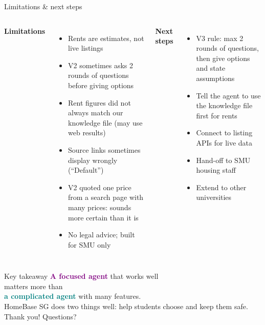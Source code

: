 \documentclass[aspectratio=169,11pt]{beamer}
\begin{document}
\begin{frame}{Limitations \& next steps}
\begin{columns}[T]
\textbf{Limitations}
\begin{itemize}\footnotesize
  \item Rents are estimates, not live listings
  \item V2 sometimes asks 2 rounds of questions before giving options
  \item Rent figures did not always match our knowledge file (may use web results)
  \item Source links sometimes display wrongly (``Default'')
  \item V2 quoted one price from a search page with many prices: sounds more certain than it is
  \item No legal advice; built for SMU only
\end{itemize}
\textbf{Next steps}
\begin{itemize}\footnotesize
  \item V3 rule: max 2 rounds of questions, then give options and state assumptions
  \item Tell the agent to use the knowledge file first for rents
  \item Connect to listing APIs for live data
  \item Hand-off to SMU housing staff
  \item Extend to other universities
\end{itemize}
\end{columns}
\end{frame}

\begin{frame}{Key takeaway}
\centering
\vspace{10pt}
{\Large \textcolor{purple}{\textbf{A focused agent}} that works well}\\[6pt]
{\Large matters more than}\\[6pt]
{\Large \textcolor{teal}{\textbf{a complicated agent}} with many features.}\\[18pt]
\normalsize HomeBase SG does two things well: \alert{help students choose} and \alert{keep them safe}.\\[14pt]
\Large Thank you! Questions?
\end{frame}
\end{document}
